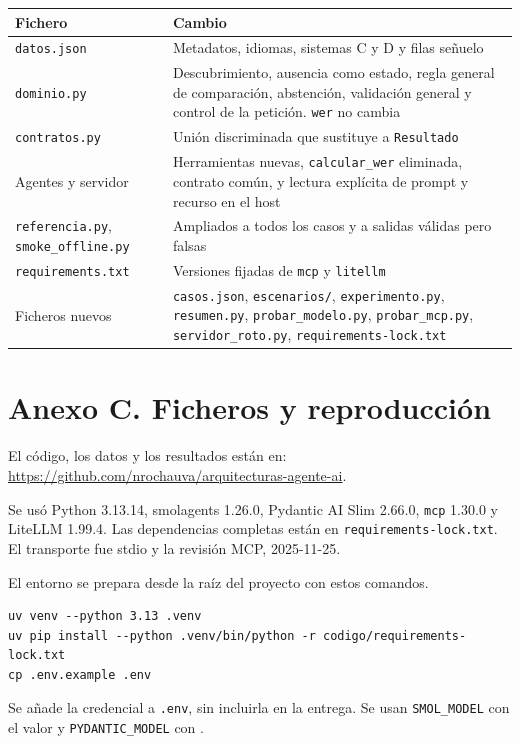 \begin{table}[H]
\centering\small
\begin{tabular}{>{\raggedright\arraybackslash}p{4.6cm}>{\raggedright\arraybackslash}p{10.5cm}}
\toprule
Fichero & Cambio \\
\midrule
\texttt{datos.json} & Metadatos, idiomas, sistemas C y D y filas señuelo \\
\texttt{dominio.py} & Descubrimiento, ausencia como estado, regla general de comparación, abstención, validación general y control de la petición. \texttt{wer} no cambia \\
\texttt{contratos.py} & Unión discriminada que sustituye a \texttt{Resultado} \\
Agentes y servidor & Herramientas nuevas, \texttt{calcular\_wer} eliminada, contrato común, y lectura explícita de prompt y recurso en el host \\
\texttt{referencia.py}, \texttt{smoke\_offline.py} & Ampliados a todos los casos y a salidas válidas pero falsas \\
\texttt{requirements.txt} & Versiones fijadas de \texttt{mcp} y \texttt{litellm} \\
Ficheros nuevos & \texttt{casos.json}, \texttt{escenarios/}, \texttt{experimento.py}, \texttt{resumen.py}, \texttt{probar\_modelo.py}, \texttt{probar\_mcp.py}, \texttt{servidor\_roto.py}, \texttt{requirements-lock.txt} \\
\bottomrule
\end{tabular}
\end{table}


\section*{Anexo C. Ficheros y reproducción}

El código, los datos y los resultados están en:
\\
\url{https://github.com/nrochauva/arquitecturas-agente-ai}.

Se usó Python 3.13.14, smolagents 1.26.0, Pydantic AI Slim 2.66.0, \texttt{mcp} 1.30.0 y LiteLLM 1.99.4. Las dependencias completas están en \texttt{requirements-lock.txt}. El transporte fue stdio y la revisión MCP, 2025-11-25.

El entorno se prepara desde la raíz del proyecto con estos comandos.
\begin{verbatim}
uv venv --python 3.13 .venv
uv pip install --python .venv/bin/python -r codigo/requirements-lock.txt
cp .env.example .env
\end{verbatim}
Se añade la credencial a \texttt{.env}, sin incluirla en la entrega. Se usan \texttt{SMOL\_MODEL} con el valor  y \texttt{PYDANTIC\_MODEL} con .

